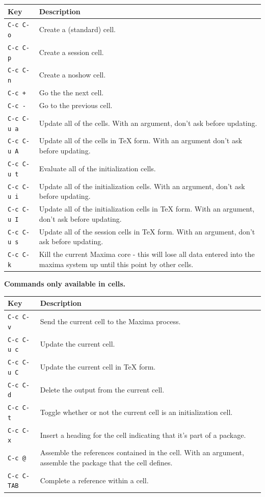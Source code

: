 \noindent
\begin{tabular}{p{\firstcol}p{\secondcol}}
\hline
\textbf{Key} & \textbf{Description}\\
\hline
\texttt{C-c C-o} & Create a (standard) cell.\\
\texttt{C-c C-p} & Create a session cell.\\
\texttt{C-c C-n} & Create a noshow cell.\\
\texttt{C-c +} & Go the the next cell.\\
\texttt{C-c -} & Go to the previous cell.\\
\texttt{C-c C-u a} & 
Update all of the cells.  With an argument, don't ask before updating.\\
\texttt{C-c C-u A}
& Update all of the cells in \TeX{} form. With an argument don't ask
before updating.\\
\texttt{C-c C-u t}
& Evaluate all of the initialization cells.\\
\texttt{C-c C-u i}
& Update all of the initialization cells.  With an argument, don't
ask before updating.\\
\texttt{C-c C-u I}
& Update all of the initialization cells in \TeX{} form.  With an
argument, don't ask before updating.\\
\texttt{C-c C-u s}
& Update all of the session cells in \TeX{} form.  With an
argument, don't ask before updating.\\
\texttt{C-c C-k}
& Kill the current Maxima core - this will lose all data entered
into the maxima system up until this point by other cells.
\end{tabular}

\smallskip

\noindent
\textbf{Commands only available in cells.}

\smallskip

\noindent
\begin{tabular}{p{\firstcol}p{\secondcol}}
\hline
\textbf{Key} & \textbf{Description}\\
\hline
\texttt{C-c C-v}
& Send the current cell to the Maxima process.\\
\texttt{C-c C-u c}
& Update the current cell.\\
\texttt{C-c C-u C}
& Update the current cell in \TeX{} form.\\
\texttt{C-c C-d}
& Delete the output from the current cell.\\
\texttt{C-c C-t}
& Toggle whether or not the current cell is an initialization cell.\\
\texttt{C-c C-x}
& Insert a heading for the cell indicating that it's part of a
package. \\
\texttt{C-c @}
& Assemble the references contained in the cell.  With an argument,
assemble the package that the cell defines.\\
\texttt{C-c C-\texttt{TAB}}
& Complete a reference within a cell.
\end{tabular}

